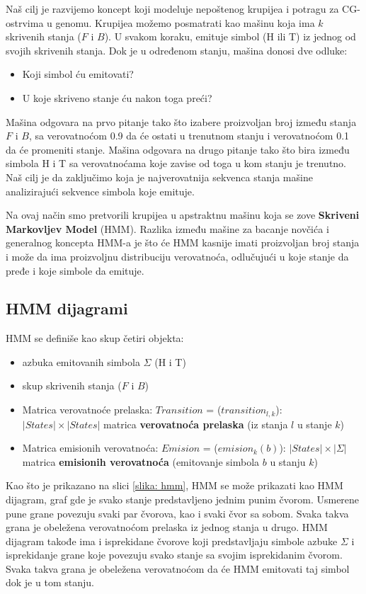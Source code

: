 Naš cilj je razvijemo koncept koji modeluje nepoštenog krupijea i potragu za CG-ostrvima u genomu. Krupijea možemo posmatrati kao
mašinu koja ima $ k $ skrivenih stanja ($ F $ i $ B $). U svakom koraku, emituje simbol (H ili T) iz jednog od svojih skrivenih stanja. Dok je u određenom stanju, mašina donosi dve odluke:
\begin{itemize}
    \item Koji simbol ću emitovati?
    \item  U koje skriveno stanje ću nakon toga preći?
\end{itemize}

Mašina odgovara na prvo pitanje tako što izabere proizvoljan broj između stanja $ F $ i $ B $, sa verovatnoćom 0.9 da će ostati u trenutnom stanju i verovatnoćom 0.1 da će promeniti stanje. Mašina odgovara na drugo pitanje tako što bira između simbola H i T sa verovatnoćama koje zavise od toga u kom stanju je trenutno. Naš cilj je da zaključimo koja je najverovatnija sekvenca stanja mašine analizirajući sekvence simbola koje emituje.

Na ovaj način smo pretvorili krupijea u apstraktnu mašinu koja se zove \textbf{Skriveni Markovljev Model} (HMM). Razlika između mašine za bacanje novčića i generalnog koncepta HMM-a je što će HMM kasnije imati proizvoljan broj stanja i može da ima proizvoljnu distribuciju verovatnoća, odlučujući u koje stanje da pređe i koje simbole da emituje.  

\subsection{HMM dijagrami}

HMM se definiše kao skup četiri objekta:
\begin{itemize}
    \item azbuka emitovanih simbola $ \Sigma $ (H i T)
    \item skup skrivenih stanja ($ F $ i $ B $)
    \item Matrica verovatnoće prelaska: $ Transition $ = ($ transition_{l,k} $): $ |States| \times |States| $ matrica
    \textbf{verovatnoća prelaska} (iz stanja $ l $ u stanje $ k $)
    \item Matrica emisionih verovatnoća: $ Emision $ = ($ emision_k(b) $): $ |States| \times |\Sigma| $ matrica
    \textbf{emisionih verovatnoća} (emitovanje simbola $ b $ u stanju $ k $)
\end{itemize}

Kao što je prikazano na slici \ref{slika: hmm}, HMM se može prikazati kao HMM dijagram, graf gde je svako stanje predstavljeno jednim punim čvorom. Usmerene pune grane povezuju svaki par čvorova, kao i svaki čvor sa sobom. Svaka takva grana je obeležena verovatnoćom prelaska iz jednog stanja u drugo. HMM dijagram takođe ima i isprekidane čvorove koji predstavljaju simbole azbuke $ \Sigma $ i isprekidanje grane koje povezuju svako stanje sa svojim isprekidanim čvorom. Svaka takva grana je obeležena verovatnoćom da će HMM emitovati taj simbol dok je u tom stanju.

